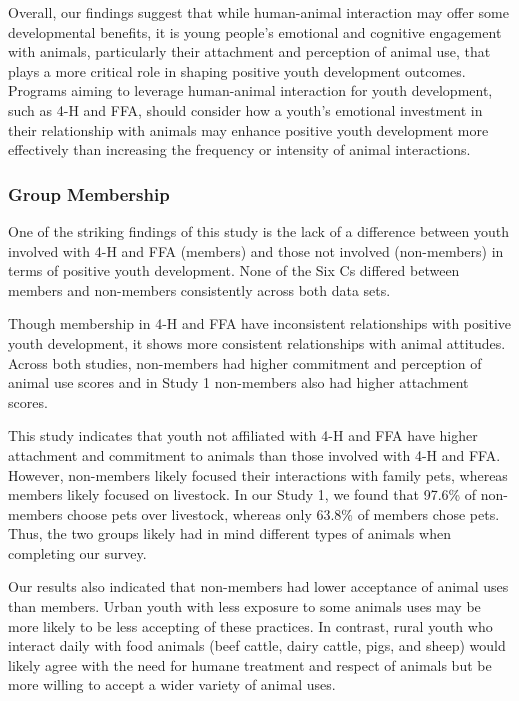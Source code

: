 \documentclass[
  jou,
  longtable,
  nolmodern,
  notxfonts,
  notimes,
  colorlinks=true,linkcolor=blue,citecolor=blue,urlcolor=blue]{apa7}
\begin{document}
Overall, our findings suggest that while human-animal interaction may
offer some developmental benefits, it is young people's emotional and
cognitive engagement with animals, particularly their attachment and
perception of animal use, that plays a more critical role in shaping
positive youth development outcomes. Programs aiming to leverage
human-animal interaction for youth development, such as 4-H and FFA,
should consider how a youth's emotional investment in their relationship
with animals may enhance positive youth development more effectively
than increasing the frequency or intensity of animal interactions.

\subsubsection{Group Membership}\label{group-membership-1}

One of the striking findings of this study is the lack of a difference
between youth involved with 4-H and FFA (members) and those not involved
(non-members) in terms of positive youth development. None of the Six Cs
differed between members and non-members consistently across both data
sets.

Though membership in 4-H and FFA have inconsistent relationships with
positive youth development, it shows more consistent relationships with
animal attitudes. Across both studies, non-members had higher commitment
and perception of animal use scores and in Study 1 non-members also had
higher attachment scores.

This study indicates that youth not affiliated with 4-H and FFA have
higher attachment and commitment to animals than those involved with 4-H
and FFA. However, non-members likely focused their interactions with
family pets, whereas members likely focused on livestock. In our Study
1, we found that 97.6\% of non-members choose pets over livestock,
whereas only 63.8\% of members chose pets. Thus, the two groups likely
had in mind different types of animals when completing our survey.

Our results also indicated that non-members had lower acceptance of
animal uses than members. Urban youth with less exposure to some animals
uses may be more likely to be less accepting of these practices. In
contrast, rural youth who interact daily with food animals (beef cattle,
dairy cattle, pigs, and sheep) would likely agree with the need for
humane treatment and respect of animals but be more willing to accept a
wider variety of animal uses.
\end{document}
